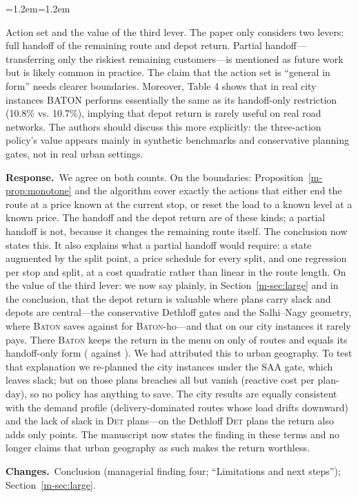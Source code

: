 \documentclass[11pt]{article}
\newenvironment{comment}{\par\medskip\noindent\color{rev}\itshape
  \begin{list}{}{\leftmargin=1.2em\rightmargin=1.2em}\item[]}%
  {\end{list}\par}
\newcommand{\resp}{\par\noindent\textbf{Response.}\ }
\newcommand{\chg}{\par\noindent\textbf{Changes.}\ }
\newcommand{\sref}[1]{Section~\ref{m-#1}}
\newcommand{\BATON}{\textsc{Baton}}
\begin{document}
\begin{comment}
Action set and the value of the third lever. The paper only considers
two levers: full handoff of the remaining route and depot return.
Partial handoff---transferring only the riskiest remaining
customers---is mentioned as future work but is likely common in
practice. The claim that the action set is ``general in form'' needs
clearer boundaries. Moreover, Table 4 shows that in real city instances
BATON performs essentially the same as its handoff-only restriction
(10.8\% vs. 10.7\%), implying that depot return is rarely useful on real
road networks. The authors should discuss this more explicitly: the
three-action policy's value appears mainly in synthetic benchmarks and
conservative planning gates, not in real urban settings.
\end{comment}
\resp We agree on both counts. On the boundaries: Proposition~\ref{m-prop:monotone}
and the algorithm cover exactly the actions that either end the route
at a price known at the current stop, or reset the load to a known
level at a known price. The handoff and the depot return are of these
kinds; a partial handoff is not, because it changes the remaining route
itself. The conclusion now states this. It also explains what a partial
handoff would require: a state augmented by the split point, a price
schedule for every split, and one regression per stop and split, at a
cost quadratic rather than linear in the route length. On the value of
the third lever: we now say plainly, in \sref{sec:large} and in the
conclusion, that the depot return is valuable where plans carry slack
and depots are central---the conservative Dethloff gates and the
Salhi--Nagy geometry, where \BATON{} saves \svSalhiBaton{} against
\svSalhiHo{} for \BATON-ho---and that on our city instances it rarely
pays. There \BATON{} keeps the return in the menu on only
\cityActShare{} of routes and equals its handoff-only form
(\svCityBaton{} against \svCityHo). We had attributed this to urban
geography. To test that explanation we re-planned the city instances
under the \textsc{SAA} gate, which leaves slack; but on those plans
breaches all but vanish (reactive cost \citySaaReact{} per plan-day), so
no policy has anything to save. The city results are equally consistent
with the demand profile (delivery-dominated routes whose load drifts
downward) and the lack of slack in \textsc{Det} plans---on the Dethloff
\textsc{Det} plans the return also adds only \detActGain{} points. The
manuscript now states the finding in these terms and no longer claims
that urban geography as such makes the return worthless.
\chg Conclusion (managerial finding four; ``Limitations and next
steps''); \sref{sec:large}.
\end{document}
